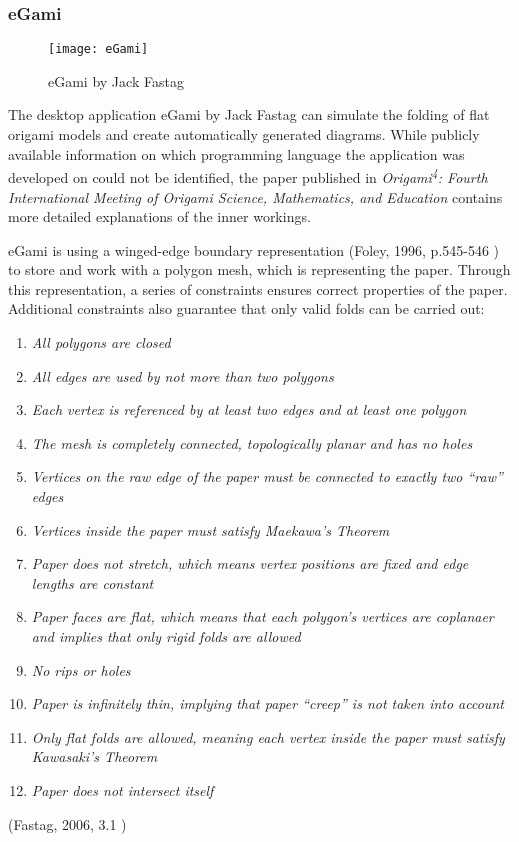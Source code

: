 \newpage
\subsubsection{eGami}
\label {eGami}
 \begin{figure}[htbp]
	\centering
	\texttt{[image: eGami]}
	\caption{eGami by Jack Fastag}
	\label{fig:eGami}
\end{figure}
\noindent The desktop application eGami \cite{eGami} by Jack Fastag can simulate the folding of flat origami models and create automatically generated diagrams. While publicly available information on which programming language the application was developed on could not be identified, the paper published in \emph{Origami\textsuperscript{4}: Fourth International Meeting of Origami Science, Mathematics, and Education} contains more detailed explanations of the inner workings.

eGami is using a winged-edge boundary representation (Foley, 1996, p.545-546 \cite{wingedEdge}) to store and work with a polygon mesh, which is representing the paper. Through this representation, a series of constraints ensures correct properties of the paper. Additional constraints also guarantee that only valid folds can be carried out:

\begin{minipage}{10cm}
\begin{center}
\begin{enumerate}[label=(\alph*)]
\item{\emph{All polygons are closed}}
\item{\emph{All edges are used by not more than two polygons}}
\item{\emph{Each vertex is referenced by at least two edges and at least one polygon}}
\item{\emph{The mesh is completely connected, topologically planar and has no holes}}
\item{\emph{Vertices on the raw edge of the paper must be connected to exactly two ``raw'' edges}}
\item{\emph{Vertices inside the paper must satisfy Maekawa's Theorem}}
\item{\emph{Paper does not stretch, which means vertex positions are fixed and edge lengths are constant}}
\item{\emph{Paper faces are flat, which means that each polygon's vertices are coplanaer and implies that only rigid folds are allowed}}
\item{\emph{No rips or holes}}
\item{\emph{Paper is infinitely thin, implying that paper ``creep'' is not taken into account}}
\item{\emph{Only flat folds are allowed, meaning each vertex inside the paper must satisfy Kawasaki's Theorem}}
\item{\emph{Paper does not intersect itself}}\\
\end{enumerate}
\end{center}
\end{minipage}
\onehalfspacing
\newline
(Fastag, 2006, 3.1 \cite{eGami})\\


